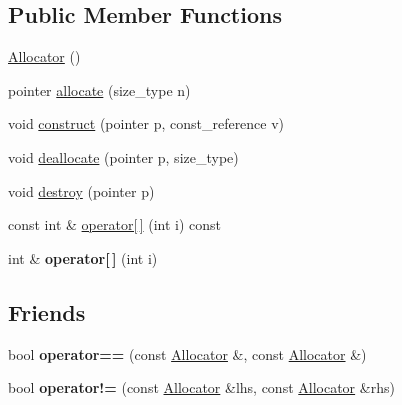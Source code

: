 \subsection*{Public Member Functions}
\begin{DoxyCompactItemize}
\item 
\hyperlink{classAllocator_a4e2bf5fbf94e2206bb72b71ad4b7ffb3}{Allocator} ()
\item 
pointer \hyperlink{classAllocator_a8a19b7b675f5434c28c68fb15de86f36}{allocate} (size\-\_\-type n)
\item 
void \hyperlink{classAllocator_a6e6a26ece248be1eb76ed691c085cd65}{construct} (pointer p, const\-\_\-reference v)
\item 
void \hyperlink{classAllocator_a8823b257191f53d7f1efac9332d8f61a}{deallocate} (pointer p, size\-\_\-type)
\item 
void \hyperlink{classAllocator_af156a6a50a8c62c70e40cf342a3b64cb}{destroy} (pointer p)
\item 
const int \& \hyperlink{classAllocator_a107cf1e09d9119f2819c0b5f6cdbe20b}{operator\mbox{[}$\,$\mbox{]}} (int i) const 
\item 
\hypertarget{classAllocator_ae57d6a9fc29cb1c1e61f58f90f7f3123}{int \& {\bfseries operator\mbox{[}$\,$\mbox{]}} (int i)}\label{classAllocator_ae57d6a9fc29cb1c1e61f58f90f7f3123}

\end{DoxyCompactItemize}
\subsection*{Friends}
\begin{DoxyCompactItemize}
\item 
\hypertarget{classAllocator_ad178871e3d4888c233e0a39e2fe36982}{bool {\bfseries operator==} (const \hyperlink{classAllocator}{Allocator} \&, const \hyperlink{classAllocator}{Allocator} \&)}\label{classAllocator_ad178871e3d4888c233e0a39e2fe36982}

\item 
\hypertarget{classAllocator_aa59693ec7b26e5ee0a2a4bc71db20040}{bool {\bfseries operator!=} (const \hyperlink{classAllocator}{Allocator} \&lhs, const \hyperlink{classAllocator}{Allocator} \&rhs)}\label{classAllocator_aa59693ec7b26e5ee0a2a4bc71db20040}

\end{DoxyCompactItemize}



